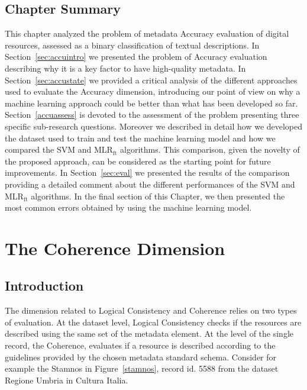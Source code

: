 \documentclass[epsfig,a4paper,12pt,titlepage]{book}
\newcommand{\mlr}{MLR$_\text{ft}$\xspace}
\begin{document}
\section{Chapter Summary}
This chapter analyzed the problem of metadata Accuracy evaluation of digital resources, assessed as a binary classification of textual descriptions. In Section~\ref{sec:accuintro} we presented the problem of Accuracy evaluation describing why it is a key factor to have high-quality metadata. In Section~\ref{sec:accustate} we provided a critical analysis of the different approaches used to evaluate the Accuracy dimension, introducing our point of view on why a machine learning approach could be better than what has been developed so far. Section~\ref{accuassess} is devoted to the assessment of the problem presenting three specific sub-research questions. Moreover we described in detail how we developed the dataset used to train and test the machine learning model and how we compared the SVM and \mlr algorithms. This comparison, given the novelty of the proposed approach,  can be considered as the starting point for future improvements. In  Section~\ref{sec:eval} we presented the results of the comparison providing a detailed comment about the different performances of the SVM and \mlr algorithms. In the final section of this Chapter, we then presented the most common errors obtained by using the machine learning model.


\chapter{The Coherence Dimension}
\label{cha:cohe}
\section{Introduction}
\label{sec:intro_cohe}

The dimension related to Logical Consistency and Coherence relies on two types of evaluation. At the dataset level, Logical Consistency checks if the resources are described using the same set of the metadata element. At the level of the single record, the Coherence, evaluates if a resource is described according to the guidelines provided by the chosen metadata standard schema.
Consider for example the Stamnos in Figure~\ref{stamnos}, record id. 5588 from the dataset Regione Umbria in Cultura Italia. 
\end{document}
